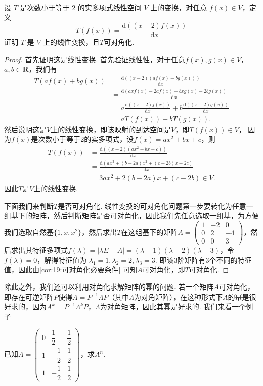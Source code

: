 \begin{example}
    设 $T$ 是次数小于等于 2 的实多项式线性空间 $V$ 上的变换，对任意 $f(x) \in V$，定义
    \[T(f(x))=\frac{\mathrm{d}((x-2)f(x))}{\mathrm{d}x}\]
    证明 $T$ 是 $V$ 上的线性变换，且$T$可对角化.
\end{example}

\begin{proof}
    首先证明这是线性变换. 首先验证线性性，对于任意$f(x),g(x)\in V$，$a,b\in\mathbf{R}$，我们有
    \begin{align*}
        T(af(x)+bg(x)) & =\frac{\mathrm{d}((x-2)(af(x)+bg(x)))}{\mathrm{d}x}                                    \\
                       & =\frac{\mathrm{d}(axf(x)-2af(x)+bxg(x)-2bg(x))}{\mathrm{d}x}                           \\
                       & =a\frac{\mathrm{d}((x-2)f(x))}{\mathrm{d}x}+b\frac{\mathrm{d}((x-2)g(x))}{\mathrm{d}x} \\
                       & =aT(f(x))+bT(g(x)).
    \end{align*}
    然后说明这是$V$上的线性变换，即该映射的到达空间是$V$，即$T(f(x))\in V$， 因为$f(x)$是次数小于等于2的实多项式，设$f(x)=ax^2+bx+c$，则
    \begin{align*}
        T(f(x)) & =\frac{\mathrm{d}((x-2)(ax^2+bx+c))}{\mathrm{d}x}          \\
                & =\frac{\mathrm{d}(ax^3+(b-2a)x^2+(c-2b)x-2c)}{\mathrm{d}x} \\
                & =3ax^2+2(b-2a)x+(c-2b)\in V.
    \end{align*}
    因此$T$是$V$上的线性变换.

    下面我们来判断$T$是否可对角化. 线性变换的可对角化问题第一步要转化为任意一组基下的矩阵，然后判断矩阵是否可对角化，因此我们先任意选取一组基，为方便我们选取自然基$\{1,x,x^2\}$，然后求出$T$在这组基下的矩阵$A=\begin{pmatrix}
            1 & -2 & 0 \\ 0 & 2 & -4 \\ 0 & 0 & 3
        \end{pmatrix}$，然后求出其特征多项式$f(\lambda)=|\lambda E-A|=(\lambda-1)(\lambda-2)(\lambda-3)$，令$f(\lambda)=0$，解得特征值为 $\lambda_1=1,\lambda_2=2,\lambda_3=3$. 即该3阶矩阵有3个不同的特征值，因此由\autoref{cor:19:可对角化必要条件} 可知$A$可对角化，即$T$可对角化.
\end{proof}

除此之外，我们还可以利用对角化求解矩阵的幂的问题. 若一个矩阵$A$可对角化，即存在可逆矩阵$P$使得$A=P^{-1}\varLambda P$（其中$\varLambda$为对角矩阵），在这种形式下$A$的幂是很好求的，因为$A^k=P^{-1}\varLambda^kP$，$\varLambda$为对角矩阵，因此其幂是好求的. 我们来看一个例子
\begin{example}
    已知$A=\begin{pmatrix}
            0 & \dfrac{1}{2}  & \dfrac{1}{2} \\[2ex]
            1 & -\dfrac{1}{2} & \dfrac{1}{2} \\[2ex]
            1 & -\dfrac{1}{2} & \dfrac{1}{2}
        \end{pmatrix}$，求$A^n$.
\end{example}

